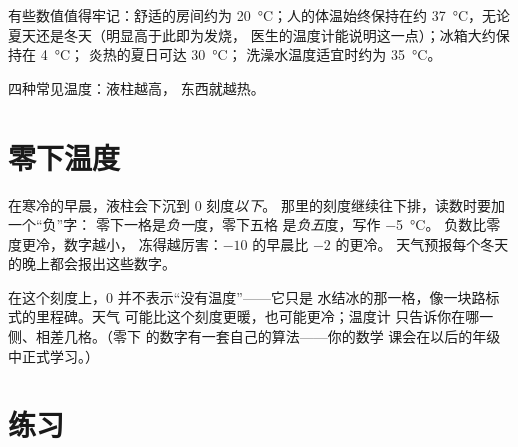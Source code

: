 \begin{example}[生活中的温度]\label{ex:g3:temperature-thermometers:livedby}
有些数值值得牢记：舒适的房间约为
\qty{20}{\celsius}；人的体温始终保持在约
\qty{37}{\celsius}，无论夏天还是冬天（明显高于此即为发烧，
医生的温度计能说明这一点）；冰箱大约保持在 \qty{4}{\celsius}；
炎热的夏日可达 \qty{30}{\celsius}；
洗澡水温度适宜时约为 \qty{35}{\celsius}。
\end{example}

\begin{omfigure}

{\small 四种常见温度：液柱越高，
东西就越热。}
\end{omfigure}

\section{零下温度}

\begin{example}[冬季的数字]\label{ex:g3:temperature-thermometers:belowzero}
在寒冷的早晨，液柱会下沉到 $0$ 刻度\emph{以下}。
那里的刻度继续往下排，读数时要加一个“负”字：
零下一格是\emph{负一}度，零下五格
是\emph{负五}度，写作 \qty{-5}{\celsius}。
负数比零度更冷，数字越小，
冻得越厉害：$-10$ 的早晨比 $-2$ 的更冷。
天气预报每个冬天的晚上都会报出这些数字。
\end{example}

\begin{remark}[零不是“没有”]\label{rem:g3:temperature-thermometers:zero}
在这个刻度上，$0$ 并不表示“没有温度”——它只是
水结冰的那一格，像一块路标式的里程碑。天气
可能比这个刻度更暖，也可能更冷；温度计
只告诉你在哪一侧、相差几格。（零下
的数字有一套自己的算法——你的数学
课会在以后的年级中正式学习。）
\end{remark}

\section{练习}

